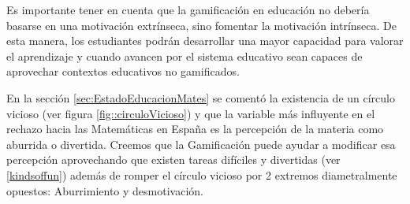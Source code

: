 Es importante tener en cuenta que la gamificación en educación no debería basarse en una motivación extrínseca, sino fomentar la motivación intrínseca. 
%
De esta manera, los estudiantes podrán desarrollar una mayor capacidad para valorar el aprendizaje y cuando avancen por el sistema educativo sean capaces de aprovechar contextos educativos no gamificados. 

En la sección \ref{sec:EstadoEducacionMates} se comentó la existencia de un círculo vicioso (ver figura \ref{fig::circuloVicioso}) y que la variable más influyente en el rechazo hacia las Matemáticas en España es la percepción de la materia como aburrida o divertida.
%
Creemos que la Gamificación puede ayudar a modificar esa percepción aprovechando que existen tareas difíciles y divertidas (ver \ref{kindsoffun}) además de romper el círculo vicioso por 2 extremos diametralmente opuestos: Aburrimiento y desmotivación.


